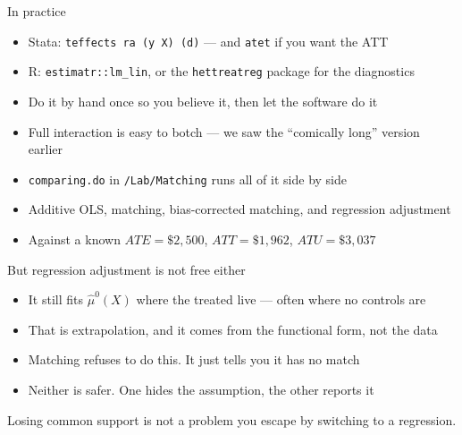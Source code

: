 \documentclass{beamer}
\newcommand{\deemph}[1]{\textcolor{warmgray}{\small #1}}
\begin{document}
\begin{frame}{In practice}

\begin{itemize}
\item Stata: \texttt{teffects ra (y X) (d)} --- and \texttt{atet} if you want the ATT
\item R: \texttt{estimatr::lm\_lin}, or the \texttt{hettreatreg} package for the diagnostics
\item Do it by hand once so you believe it, then let the software do it
\item Full interaction is easy to botch --- we saw the ``comically long'' version earlier
\end{itemize}

\vspace{0.6em}

\begin{itemize}
\item \texttt{comparing.do} in \texttt{/Lab/Matching} runs all of it side by side
\item Additive OLS, matching, bias-corrected matching, and regression adjustment
\item Against a known $ATE = \$2{,}500$, $ATT = \$1{,}962$, $ATU = \$3{,}037$
\end{itemize}

\end{frame}


\begin{frame}{But regression adjustment is not free either}

\begin{itemize}
\item It still fits $\widehat{\mu}^0(X)$ where the treated live --- often where no controls are
\item That is extrapolation, and it comes from the functional form, not the data
\item Matching refuses to do this. It just tells you it has no match
\item Neither is safer. One hides the assumption, the other reports it
\end{itemize}

\vspace{0.6em}

\deemph{Losing common support is not a problem you escape by switching to a regression.}

\end{frame}
\end{document}
